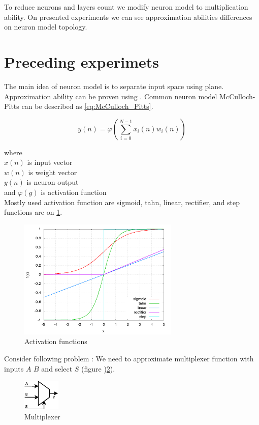 \documentclass[times]{cpeauth}
\begin{document}
To reduce neurons and layers count we modify neuron model to multiplication ability.
On presented experiments we can see approximation abilities differences on neuron model topology.


\section{Preceding experimets}

The main idea of neuron model is to separate input space using plane. Approximation
ability can be proven using \cite{bib:Approximation_1}. Common neuron model McCulloch-Pitts can be described as \ref{eq:McCulloch_Pitts}.

\begin{equation}
\label{eq:McCulloch_Pitts}
  y(n) = \varphi(\sum_{i = 0}^{N-1} x_i(n)w_i(n))
\end{equation}

where \\
$x(n)$ is input vector \\
$w(n)$ is weight vector \\
$y(n)$ is neuron output \\
and $\varphi(g)$ is activation function \\

Mostly used activation function are sigmoid, tahn, linear, rectifier, and step functions
are on \ref{img:activation_functions}.


\begin{figure}[!ht]
\centering
\includegraphics[width=3.0in]{images/nn_functions.png}
\caption{Activation functions}
\label{img:activation_functions}
\end{figure}

Consider following problem : We need to approximate multiplexer function with inputs
$A$ $B$ and select $S$ (figure )\ref{img:multiplexer}).

\begin{figure}[!ht]
\centering
\includegraphics[width=0.7in]{images/mux.eps}
\caption{Multiplexer}
\label{img:multiplexer}
\end{figure}
\end{document}
